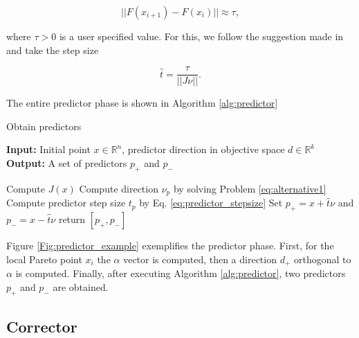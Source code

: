 \begin{equation}
|| F(x_{i+1}) - F(x_i) || \approx \tau,
\label{eq:spreadness_solutions}
\end{equation}

where $\tau > 0$ is a user specified value. For this, we follow the suggestion made in \cite{hillermeier01} and take the step size

\begin{equation}
\hat{t} = \frac{\tau}{|| J \nu ||}.
\label{eq:predictor_stepsize}
\end{equation}

The entire predictor phase is shown in Algorithm \ref{alg:predictor}

\setcounter{algorithm}{0}
\begin{algorithm}[H]
\caption{Obtain predictors}\label{alg:predictor}
\textbf{Input:} Initial point $x \in \mathbb{R}^n$, predictor direction in objective space $d \in \mathbb{R}^k$\\
\textbf{Output:} A set of predictors $p_+$ and $p_-$
	\begin{algorithmic}[1]
		\State Compute $J(x)$
		\State Compute direction $\nu_p$	by solving Problem \eqref{eq:alternative1}
		\State Compute predictor step size $t_p$ by Eq. \eqref{eq:predictor_stepsize}
		\State Set $p_+ = x + \hat{t} \nu$ and $p_- = x - \hat{t} \nu$ 
		\State return $[p_+, p_-]$   
	\end{algorithmic}
\end{algorithm}

Figure \ref{Fig:predictor_example} exemplifies the predictor phase. First, for the local Pareto point $x_i$ the $\alpha$ vector is computed, then a direction $d_+$ orthogonal to $\alpha$ is computed. Finally, after executing Algorithm \ref{alg:predictor}, two predictors $p_+$ and $p_-$ are obtained.

\begin{comment}

 \begin{figure}[H] 
	\centering \def\svgwidth{190pt} 
	 
	\caption{Computation of the predictors} 
	\label{Fig:predictor_example}
\end{figure}

\end{comment}

\subsection{Corrector}
\label{sec:corrector}

